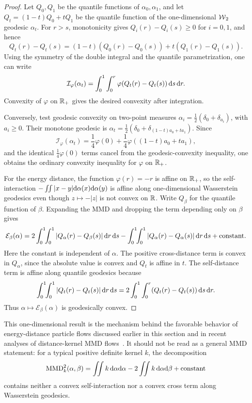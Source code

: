 \begin{proof}
	Let \(Q_0,Q_1\) be the quantile functions of \(\alpha_0,\alpha_1\), and let \(Q_t=(1-t)Q_0+tQ_1\) be the quantile function of the one-dimensional \(\operatorname{\mathcal{W}}_2\) geodesic \(\alpha_t\). For \(r>s\), monotonicity gives \(Q_i(r)-Q_i(s)\geq0\) for \(i=0,1\), and hence
	\[
		Q_t(r)-Q_t(s)
		=
		(1-t)(Q_0(r)-Q_0(s))+t(Q_1(r)-Q_1(s)).
	\]
	Using the symmetry of the double integral and the quantile parametrization, one can write
	\[
		\mathcal I_\varphi(\alpha_t)
		=
		\int_0^1\int_0^r
		\varphi(Q_t(r)-Q_t(s))\,\mathrm{d} s\,\mathrm{d} r.
	\]
	Convexity of \(\varphi\) on \(\mathbb{R}_+\) gives the desired convexity after integration.

	Conversely, test geodesic convexity on two-point measures \(\alpha_i=\frac12(\delta_0+\delta_{a_i})\), with \(a_i\geq0\). Their monotone geodesic is \(\alpha_t=\frac12(\delta_0+\delta_{(1-t)a_0+t a_1})\). Since
	\[
		\mathcal I_\varphi(\alpha_t)
		=
		\frac14\varphi(0)+\frac14\varphi((1-t)a_0+t a_1),
	\]
	and the identical \(\frac14\varphi(0)\) terms cancel from the geodesic-convexity inequality, one obtains the ordinary convexity inequality for \(\varphi\) on \(\mathbb{R}_+\).

	For the energy distance, the function \(\varphi(r)=-r\) is affine on \(\mathbb{R}_+\), so the self-interaction \(-\iint |x-y|\mathrm{d}\alpha(x)\mathrm{d}\alpha(y)\) is affine along one-dimensional Wasserstein geodesics even though \(z\mapsto-|z|\) is not convex on \(\mathbb{R}\). Write \(Q_\beta\) for the quantile function of \(\beta\). Expanding the MMD and dropping the term depending only on \(\beta\) gives
	\[
		\mathcal E_\beta(\alpha)
		=
		2\int_0^1\!\!\int_0^1 |Q_\alpha(r)-Q_\beta(s)|\,\mathrm{d} r\,\mathrm{d} s
		-
		\int_0^1\!\!\int_0^1 |Q_\alpha(r)-Q_\alpha(s)|\,\mathrm{d} r\,\mathrm{d} s
		+\mathrm{constant}.
	\]
	Here the constant is independent of \(\alpha\). The positive cross-distance term is convex in \(Q_\alpha\), since the absolute value is convex and \(Q_t\) is affine in \(t\). The self-distance term is affine along quantile geodesics because
	\[
		\int_0^1\!\!\int_0^1 |Q_t(r)-Q_t(s)|\,\mathrm{d} r\,\mathrm{d} s
		=
		2\int_0^1\int_0^r (Q_t(r)-Q_t(s))\,\mathrm{d} s\,\mathrm{d} r.
	\]
	Thus \(\alpha\mapsto\mathcal E_\beta(\alpha)\) is geodesically convex.
\end{proof}

This one-dimensional result is the mechanism behind the favorable behavior of energy-distance particle flows discussed earlier in this section and in recent analyses of distance-kernel MMD flows~\citep{DuongRuxSteinSteidl2024DistanceMMD}. It should not be read as a general MMD statement: for a typical positive definite kernel \(k\), the decomposition
\[
	\operatorname{MMD}_k^2(\alpha,\beta)
	=
	\iint k\,\mathrm{d}\alpha\mathrm{d}\alpha
	-2\iint k\,\mathrm{d}\alpha\mathrm{d}\beta
	+\mathrm{constant}
\]
contains neither a convex self-interaction nor a convex cross term along Wasserstein geodesics.

